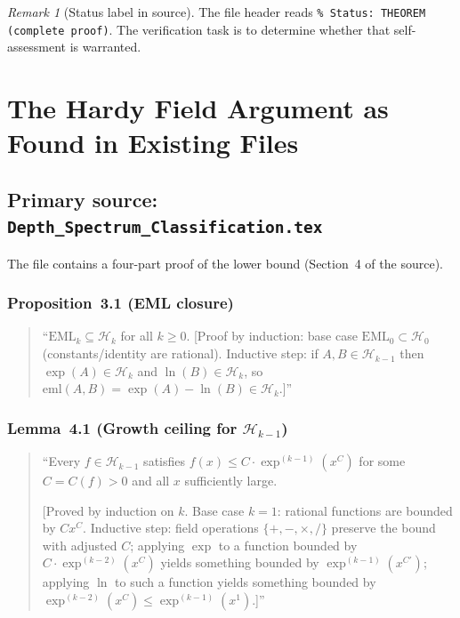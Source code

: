 \documentclass[12pt,a4paper]{article}
\theoremstyle{definition}
\theoremstyle{remark}
\newtheorem{remark}[theorem]{Remark}
\begin{document}
\begin{remark}[Status label in source]
The file header reads \texttt{\% Status: THEOREM (complete proof)}.
The verification task is to determine whether that self-assessment is warranted.
\end{remark}

\section{The Hardy Field Argument as Found in Existing Files}

\subsection{Primary source: \texttt{Depth\_Spectrum\_Classification.tex}}

The file contains a four-part proof of the lower bound (Section~4 of the
source).

\subsubsection*{Proposition~3.1 (EML closure)}
\begin{quote}
``$\mathrm{EML}_k \subseteq \mathcal{H}_k$ for all $k\geq 0$. [Proof by
induction: base case $\mathrm{EML}_0\subset\mathcal{H}_0$ (constants/identity
are rational). Inductive step: if $A,B\in\mathcal{H}_{k-1}$ then
$\exp(A)\in\mathcal{H}_k$ and $\ln(B)\in\mathcal{H}_k$, so
$\mathrm{eml}(A,B)=\exp(A)-\ln(B)\in\mathcal{H}_k$.]''
\end{quote}

\subsubsection*{Lemma~4.1 (Growth ceiling for $\mathcal{H}_{k-1}$)}
\begin{quote}
``Every $f\in\mathcal{H}_{k-1}$ satisfies $f(x)\leq C\cdot\exp^{(k-1)}(x^C)$
for some $C=C(f)>0$ and all $x$ sufficiently large.

[Proved by induction on $k$. Base case $k=1$: rational functions are bounded by
$Cx^C$. Inductive step: field operations $\{+,-,\times,/\}$ preserve the bound
with adjusted $C$; applying $\exp$ to a function bounded by
$C\cdot\exp^{(k-2)}(x^C)$ yields something bounded by $\exp^{(k-1)}(x^{C'})$;
applying $\ln$ to such a function yields something bounded by
$\exp^{(k-2)}(x^C)\leq\exp^{(k-1)}(x^1)$.]''
\end{quote}
\end{document}
